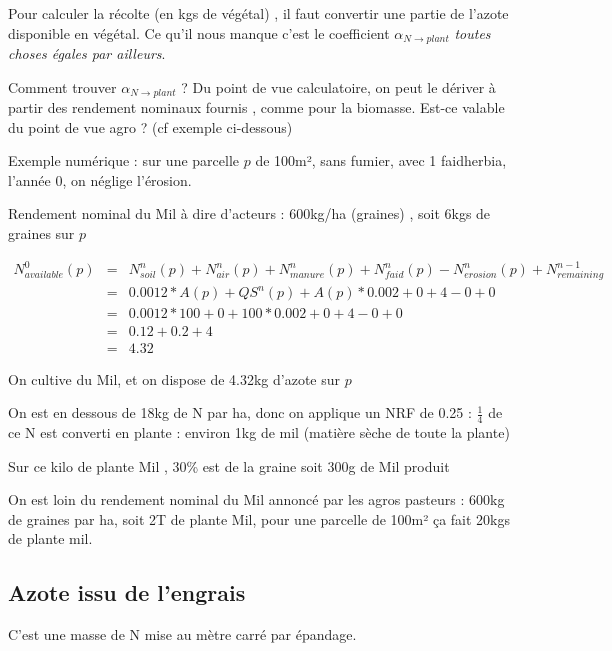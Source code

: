 \documentclass[10pt,a4paper,french]{article} %
\begin{document}
Pour calculer la récolte (en kgs de végétal) , il faut convertir une partie de l'azote disponible en végétal.
Ce qu'il nous manque c'est le coefficient $\alpha_{N \rightarrow plant}$  \emph{toutes choses égales par ailleurs}. 




\begin{tcolorbox}[noparskip,
    colback=LightGreen,colframe=DarkGreen,%
    colbacklower=LimeGreen!75!LightGreen,%
    title=Question/Problème]

Comment trouver $\alpha_{N \rightarrow plant}$  ? Du point de vue calculatoire, on peut le dériver à partir des rendement nominaux fournis , comme pour la biomasse. Est-ce valable du point de vue agro ? (cf exemple ci-dessous)

\end{tcolorbox}


Exemple numérique : 
sur une parcelle $p$ de 100m², sans fumier, avec 1 faidherbia, l'année 0, on néglige l'érosion.

Rendement nominal du Mil à dire d'acteurs : 600kg/ha (graines) , soit 6kgs de graines sur $p$

\begin{eqnarray*}
N_{available}^{0}(p)&=&N_{soil}^{n}(p)  +N_{air}^{n}(p)+N_{manure}^{n}(p)+N_{faid}^{n}(p)-N_{erosion}^n(p) + N_{remaining}^{n-1} \\
                    &=& 0.0012 * A(p) + QS^{n}(p) + A(p) * 0.002 +0                +4              -0                + 0  \\
                    &=&  0.0012 * 100 + 0 + 100 * 0.002 +0+4-0 + 0  \\
                    &=&  0.12 + 0.2 +4  \\
                    &=& 4.32
\end{eqnarray*}

On cultive  du Mil, et on dispose de 4.32kg d'azote sur $p$

On est en dessous de 18kg de N par ha, donc on applique un NRF de 0.25 : $\frac{1}{4}$ de ce N est converti en plante : environ 1kg de mil (matière sèche de toute la plante)

Sur ce kilo de plante Mil , 30\% est de la graine soit 300g de Mil produit

On est loin du rendement nominal du Mil annoncé par les agros pasteurs : 600kg de graines par ha, soit 2T de plante Mil, pour une parcelle de 100m² ça fait 20kgs de plante mil.  




\subsection{Azote issu de l'engrais}


C'est une masse de N mise au mètre carré par épandage.
\end{document}
